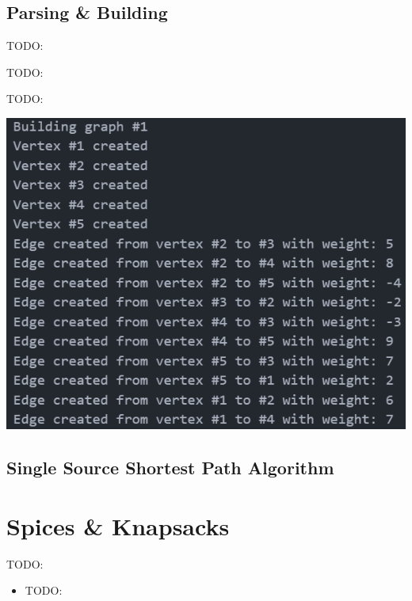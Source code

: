 \documentclass[12pt, letterpaper]{article}
\begin{document}
\subsection{Parsing \& Building} \label{Graph_ParseBuild}
TODO:
\begin{center}
   
\end{center}
TODO:
\begin{center}
   
\end{center}
TODO:
\begin{center}
   \includegraphics{images/Graph1_ParseBuild.png}
\end{center}

\subsection{Single Source Shortest Path Algorithm} \label{Graph_SSSP}

\section{Spices \& Knapsacks} \label{SpiceKnapsack}
TODO:
\begin{itemize}
   \item TODO:
\end{itemize}
\end{document}
